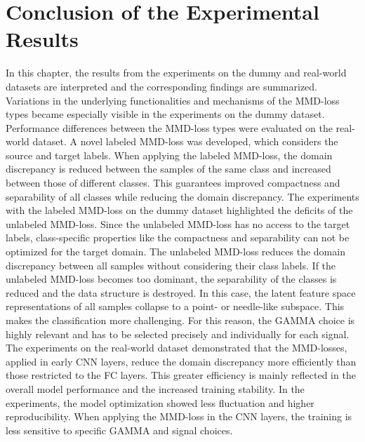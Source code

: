 \section{Conclusion of the Experimental Results}\label{sec:Performance_overview}
In this chapter, the results from the experiments on the dummy and real-world datasets are interpreted and the corresponding findings are summarized. Variations in the underlying functionalities and mechanisms of the MMD-loss types became especially visible in the experiments on the dummy dataset. Performance differences between the MMD-loss types were evaluated on the real-world dataset. A novel labeled MMD-loss was developed, which considers the source and target labels. When applying the labeled MMD-loss, the domain discrepancy is reduced between the samples of the same class and increased between those of different classes. This guarantees improved compactness and separability of all classes while reducing the domain discrepancy. The experiments with the labeled MMD-loss on the dummy dataset highlighted the deficits of the unlabeled MMD-loss. Since the unlabeled MMD-loss has no access to the target labels, class-specific properties like the compactness and separability can not be optimized for the target domain. The unlabeled MMD-loss reduces the domain discrepancy between all samples without considering their class labels. If the unlabeled MMD-loss becomes too dominant, the separability of the classes is reduced and the data structure is destroyed. In this case, the latent feature space representations of all samples collapse to a point- or needle-like subspace. This makes the classification more challenging. For this reason, the GAMMA choice is highly relevant and has to be selected precisely and individually for each signal. The experiments on the real-world dataset demonstrated that the MMD-losses, applied in early CNN layers, reduce the domain discrepancy more efficiently than those restricted to the FC layers. This greater efficiency is mainly reflected in the overall model performance and the increased training stability. In the experiments, the model optimization showed less fluctuation and higher reproducibility. When applying the MMD-loss in the CNN layers, the training is less sensitive to specific GAMMA and signal choices. 